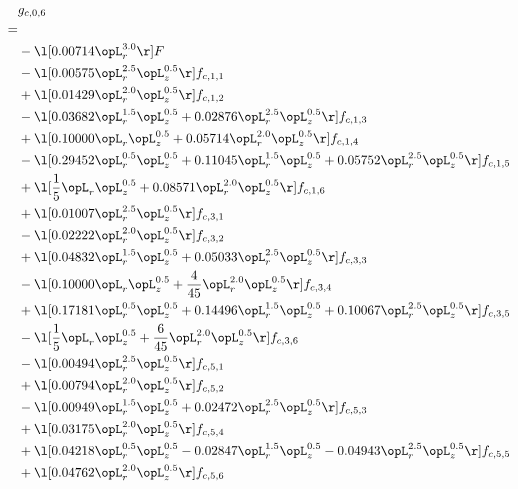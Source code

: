 \begin{alignat}{2} 
\label{eq:g_06_0} 
& g_{c,0,6} \nonumber \\ 
 = \\ 
& - \l[  0.00714 \opL_r^{3.0}  \r] F \nonumber \\ 
& - \l[  0.00575 \opL_r^{2.5} \opL_z^{0.5}  \r] f_{c,1,1} \nonumber \\ 
& + \l[  0.01429 \opL_r^{2.0} \opL_z^{0.5}  \r] f_{c,1,2} \nonumber \\ 
& - \l[  0.03682 \opL_r^{1.5} \opL_z^{0.5} +  0.02876 \opL_r^{2.5} \opL_z^{0.5}  \r] f_{c,1,3} \nonumber \\ 
& + \l[  0.10000 \opL_r \opL_z^{0.5} +  0.05714 \opL_r^{2.0} \opL_z^{0.5}  \r] f_{c,1,4} \nonumber \\ 
& - \l[  0.29452 \opL_r^{0.5} \opL_z^{0.5} +  0.11045 \opL_r^{1.5} \opL_z^{0.5} +  0.05752 \opL_r^{2.5} \opL_z^{0.5}  \r] f_{c,1,5} \nonumber \\ 
& + \l[ \frac{1}{5} \opL_r \opL_z^{0.5} +  0.08571 \opL_r^{2.0} \opL_z^{0.5}  \r] f_{c,1,6} \nonumber \\ 
& + \l[  0.01007 \opL_r^{2.5} \opL_z^{0.5}  \r] f_{c,3,1} \nonumber \\ 
& - \l[  0.02222 \opL_r^{2.0} \opL_z^{0.5}  \r] f_{c,3,2} \nonumber \\ 
& + \l[  0.04832 \opL_r^{1.5} \opL_z^{0.5} +  0.05033 \opL_r^{2.5} \opL_z^{0.5}  \r] f_{c,3,3} \nonumber \\ 
& - \l[  0.10000 \opL_r \opL_z^{0.5} + \frac{4}{45} \opL_r^{2.0} \opL_z^{0.5}  \r] f_{c,3,4} \nonumber \\ 
& + \l[  0.17181 \opL_r^{0.5} \opL_z^{0.5} +  0.14496 \opL_r^{1.5} \opL_z^{0.5} +  0.10067 \opL_r^{2.5} \opL_z^{0.5}  \r] f_{c,3,5} \nonumber \\ 
& - \l[ \frac{1}{5} \opL_r \opL_z^{0.5} + \frac{6}{45} \opL_r^{2.0} \opL_z^{0.5}  \r] f_{c,3,6} \nonumber \\ 
& - \l[  0.00494 \opL_r^{2.5} \opL_z^{0.5}  \r] f_{c,5,1} \nonumber \\ 
& + \l[  0.00794 \opL_r^{2.0} \opL_z^{0.5}  \r] f_{c,5,2} \nonumber \\ 
& - \l[  0.00949 \opL_r^{1.5} \opL_z^{0.5} +  0.02472 \opL_r^{2.5} \opL_z^{0.5}  \r] f_{c,5,3} \nonumber \\ 
& + \l[  0.03175 \opL_r^{2.0} \opL_z^{0.5}  \r] f_{c,5,4} \nonumber \\ 
& + \l[  0.04218 \opL_r^{0.5} \opL_z^{0.5}   -0.02847 \opL_r^{1.5} \opL_z^{0.5}   -0.04943 \opL_r^{2.5} \opL_z^{0.5}  \r] f_{c,5,5} \nonumber \\ 
& + \l[  0.04762 \opL_r^{2.0} \opL_z^{0.5}  \r] f_{c,5,6} \nonumber \\ 
\end{alignat} 


